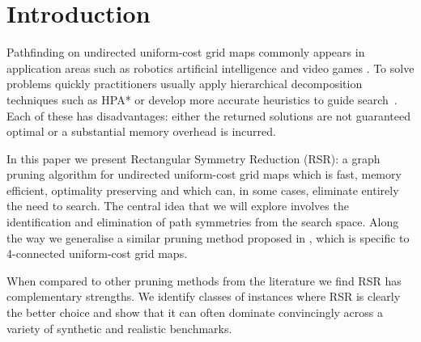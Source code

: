 \section{Introduction}
\label{sec:introduction}
Pathfinding on undirected uniform-cost grid maps commonly appears in 
application areas such as robotics \cite{lee09}
artificial intelligence \cite{wang09} and video games \cite{davis00,sturtevant10}.  
To solve problems quickly practitioners usually apply
hierarchical decomposition techniques such as HPA* \cite{botea04,sturtevant10} or 
develop more accurate heuristics to guide search~\cite{bjornsson06,sturtevant09,goldenberg10}.  
Each of these has disadvantages: either the returned solutions are
not guaranteed optimal or a substantial memory overhead is incurred.
\par
In this paper we present Rectangular Symmetry Reduction (RSR): a graph pruning
algorithm for undirected uniform-cost grid maps which is fast, memory efficient,
optimality preserving and which can, in some cases, eliminate entirely the need
to search.  
The central idea that we will explore involves the identification
and elimination of path symmetries from the search space. 
Along the way we generalise a similar pruning method proposed in \cite{harabor10},
which is specific to 4-connected uniform-cost grid maps.
\par
When compared to other pruning methods from the literature we
find RSR has complementary strengths. We identify classes of instances
where RSR is clearly the better choice and show that it can often dominate convincingly
across a variety of synthetic and realistic benchmarks.

